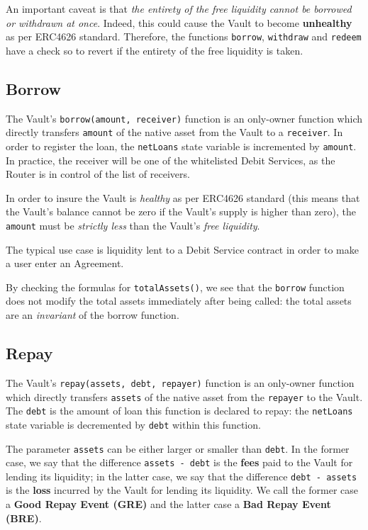 \documentclass[a4paper,10 pt]{article}
\theoremstyle{definition}
\begin{document}
An important caveat is that {\it the entirety of the free liquidity cannot be borrowed or withdrawn at once}. Indeed, this could cause the Vault to become {\bf unhealthy} as per ERC4626 standard. Therefore, the functions \verb|borrow|, \verb|withdraw| and \verb|redeem| have a check so to revert if the entirety of the free liquidity is taken. 
\subsection{Borrow}\label{borrowSub}

The Vault's \verb|borrow(amount, receiver)| function is an only-owner function which directly transfers \verb|amount| of the native asset from the Vault to a \verb|receiver|. In order to register the loan, the \verb|netLoans| state variable is incremented by \verb|amount|. In practice, the receiver will be one of the whitelisted Debit Services, as the Router is in control of the list of receivers.

In order to insure the Vault is {\it healthy} as per ERC4626 standard (this means that the Vault's balance cannot be zero if the Vault's supply is higher than zero),  the \verb|amount| must be {\it strictly less} than the Vault's {\it free liquidity}.

The typical use case is liquidity lent to a Debit Service contract in order to make a user enter an Agreement.

By checking the formulas for \verb|totalAssets()|, we see that the \verb|borrow| function does not modify the total assets immediately after being called: the total assets are an {\it invariant} of the borrow function.
\subsection{Repay}\label{repaySub}

The Vault's \verb|repay(assets, debt, repayer)| function is an only-owner function which directly transfers \verb|assets| of the native asset from the \verb|repayer| to the Vault. The \verb|debt| is the amount of loan this function is declared to repay: the \verb|netLoans| state variable is decremented by \verb|debt| within this function.

The parameter \verb|assets| can be either larger or smaller than \verb|debt|. In the former case, we say that the difference \verb|assets - debt| is the {\bf fees} paid to the Vault for lending its liquidity; in the latter case, we say that the difference \verb|debt - assets| is the {\bf loss} incurred by the Vault for lending its liquidity. We call the former case a {\bf Good Repay Event (GRE)} and the latter case a {\bf Bad Repay Event (BRE)}. 
\end{document}
